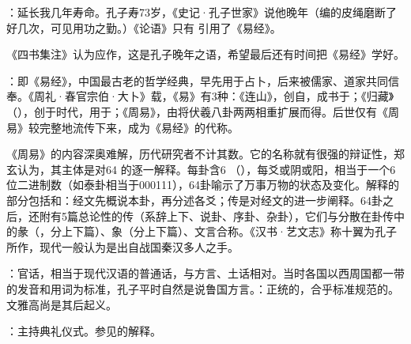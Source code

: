{
\item {}：延长我几年寿命。孔子寿73岁，《史记·孔子世家》说他晚年（编的皮绳磨断了好几次，可见用功之勤。）《论语》只有  引用了《易经》。

《四书集注》认为应作，这是孔子晚年之语，希望最后还有时间把《易经》学好。

\item {}：即《易经》，中国最古老的哲学经典，早先用于占卜，后来被儒家、道家共同信奉。《周礼·春官宗伯·大卜》载，《易》有3种：《连山》，创自，成书于；《归藏》（），创于时代，用于；《周易》，由将伏羲八卦两两相重扩展而得。后世仅有《周易》较完整地流传下来，成为《易经》的代称。

《周易》的内容深奥难解，历代研究者不计其数。它的名称就有很强的辩证性，郑玄认为，其主体是对64 的逐一解释。每卦含6 （），每爻或阴或阳，相当于一个6位二进制数（如泰卦相当于000111），64卦喻示了万事万物的状态及变化。解释的部分包括和：经文先概说本卦，再分述各爻；传是对经文的进一步阐释。64卦之后，还附有5篇总论性的传（系辞上下、说卦、序卦、杂卦），它们与分散在卦传中的彖（，分上下篇）、象（分上下篇）、文言合称。《汉书·艺文志》称十翼为孔子所作，现代一般认为是出自战国秦汉多人之手。
}
{}


{
\item {}：官话，相当于现代汉语的普通话，与方言、土话相对。当时各国以西周国都一带的发音和用词为标准，孔子平时自然是说鲁国方言。：正统的，合乎标准规范的。文雅高尚是其后起义。
\item {}：主持典礼仪式。参见的解释。
}
{}


